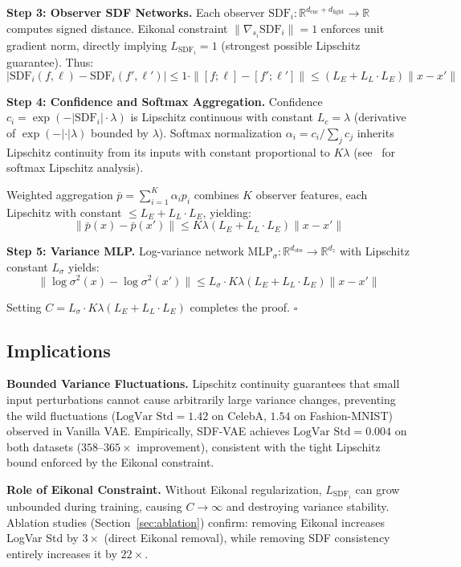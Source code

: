 \documentclass[10pt,twocolumn,letterpaper]{article}
\begin{document}
\textbf{Step 3: Observer SDF Networks.} Each observer $\text{SDF}_i: \mathbb{R}^{d_{\text{enc}} + d_{\text{light}}} \to \mathbb{R}$ computes signed distance. Eikonal constraint $\|\nabla_{s_i} \text{SDF}_i\| = 1$ enforces unit gradient norm, directly implying $L_{\text{SDF}_i} = 1$ (strongest possible Lipschitz guarantee). Thus:
\[
|\text{SDF}_i(f, \ell) - \text{SDF}_i(f', \ell')| \leq 1 \cdot \|[f; \ell] - [f'; \ell']\| \leq (L_E + L_L \cdot L_E) \|x - x'\|
\]

\textbf{Step 4: Confidence and Softmax Aggregation.} Confidence $c_i = \exp(-|\text{SDF}_i| \cdot \lambda)$ is Lipschitz continuous with constant $L_c = \lambda$ (derivative of $\exp(-|\cdot| \lambda)$ bounded by $\lambda$). Softmax normalization $\alpha_i = c_i / \sum_j c_j$ inherits Lipschitz continuity from its inputs with constant proportional to $K \lambda$ (see~\cite{guo2017calibration} for softmax Lipschitz analysis).

Weighted aggregation $\bar{p} = \sum_{i=1}^K \alpha_i p_i$ combines $K$ observer features, each Lipschitz with constant $\leq L_E + L_L \cdot L_E$, yielding:
\[
\|\bar{p}(x) - \bar{p}(x')\| \leq K \lambda (L_E + L_L \cdot L_E) \|x - x'\|
\]

\textbf{Step 5: Variance MLP.} Log-variance network $\text{MLP}_\sigma: \mathbb{R}^{d_{\text{obs}}} \to \mathbb{R}^{d_z}$ with Lipschitz constant $L_\sigma$ yields:
\[
\|\log \sigma^2(x) - \log \sigma^2(x')\| \leq L_\sigma \cdot K \lambda (L_E + L_L \cdot L_E) \|x - x'\|
\]

Setting $C = L_\sigma \cdot K \lambda (L_E + L_L \cdot L_E)$ completes the proof. \hfill $\square$

\subsection{Implications}

\textbf{Bounded Variance Fluctuations.} Lipschitz continuity guarantees that small input perturbations cannot cause arbitrarily large variance changes, preventing the wild fluctuations ($\text{LogVar Std} = 1.42$ on CelebA, $1.54$ on Fashion-MNIST) observed in Vanilla VAE. Empirically, SDF-VAE achieves $\text{LogVar Std} = 0.004$ on both datasets ($358$--$365\times$ improvement), consistent with the tight Lipschitz bound enforced by the Eikonal constraint.

\textbf{Role of Eikonal Constraint.} Without Eikonal regularization, $L_{\text{SDF}_i}$ can grow unbounded during training, causing $C \to \infty$ and destroying variance stability. Ablation studies (Section~\ref{sec:ablation}) confirm: removing Eikonal increases LogVar Std by $3\times$ (direct Eikonal removal), while removing SDF consistency entirely increases it by $22\times$.
\end{document}
